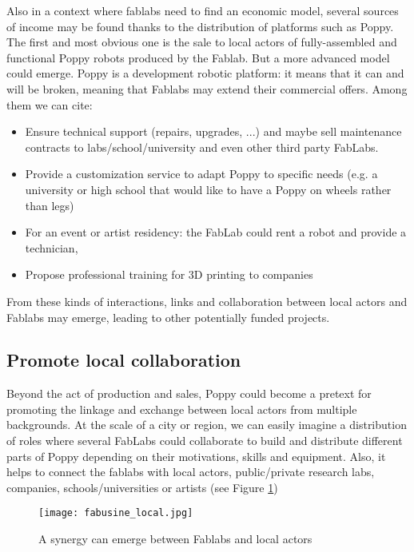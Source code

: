 Also in a context where fablabs need to find an economic model, several sources of income may be found thanks to the distribution of platforms such as Poppy. The first and most obvious one is the sale to local actors of fully-assembled and functional Poppy robots produced by the Fablab. But a more advanced model could emerge. Poppy is a development robotic platform: it means that it can and will be broken, meaning that Fablabs may extend their commercial offers. Among them we can cite:

\begin{itemize}
    \item Ensure technical support (repairs, upgrades, ...) and maybe sell maintenance contracts to labs/school/university and even other third party FabLabs.
    \item Provide a customization service to adapt Poppy to specific needs (e.g. a university or high school that would like to have a Poppy on wheels rather than legs)
    \item For an event or artist residency: the FabLab could rent a robot and provide a technician,
    \item Propose professional training for 3D printing to companies
\end{itemize}

From these kinds of interactions, links and collaboration between local actors and Fablabs may emerge, leading to other potentially funded projects.

\subsection{Promote local collaboration} %

Beyond the act of production and sales, Poppy could become a pretext for promoting the linkage and exchange between local actors from multiple backgrounds. At the scale of a city or region, we can easily imagine a distribution of roles where several FabLabs could collaborate to build and distribute different parts of Poppy depending on their motivations, skills and equipment.
Also, it helps to connect the fablabs with local actors, public/private research labs, companies, schools/universities or artists (see Figure \ref{fig:local_synergy})

\begin{figure}[tb]
    \begin{center}
        \texttt{[image: fabusine\_local.jpg]}
    \end{center}
    \caption{A synergy can emerge between Fablabs and local actors}
    \label{fig:local_synergy}
\end{figure}

